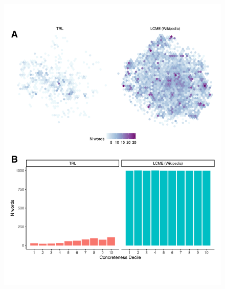 \documentclass[9pt,twoside,lineno]{pnas-new}
\begin{document}
 \begin{figure}[h]
\centering
     \includegraphics[width = 6in]{suppfigs/thompson_word_comparisonC.pdf}

\end{figure}
\end{document}
